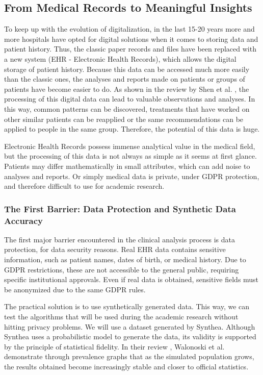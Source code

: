 \subsection{From Medical Records to Meaningful Insights}

To keep up with the evolution of digitalization, in the last 15-20 years more and more hospitals have opted for digital solutions when it comes to storing data and patient history. Thus, the classic paper records and files have been replaced with a new system (EHR - Electronic Health Records), which allows the digital storage of patient history. Because this data can be accessed much more easily than the classic ones, the analyses and reports made on patients or groups of patients have become easier to do. As shown in the review by Shen et al. \cite{shen2025}, the processing of this digital data can lead to valuable observations and analyses. In this way, common patterns can be discovered, treatments that have worked on other similar patients can be reapplied or the same recommendations can be applied to people in the same group. Therefore, the potential of this data is huge.

Electronic Health Records possess immense analytical value in the medical field, but the processing of this data is not always as simple as it seems at first glance. Patients may differ mathematically in small attributes, which can add noise to analyses and reports. Or simply medical data is private, under GDPR protection, and therefore difficult to use for academic research.

\subsubsection*{The First Barrier: Data Protection and Synthetic Data Accuracy}

The first major barrier encountered in the clinical analysis process is data protection, for data security reasons. Real EHR data contains sensitive information, such as patient names, dates of birth, or medical history. Due to GDPR restrictions, these are not accessible to the general public, requiring specific institutional approvals. Even if real data is obtained, sensitive fields must be anonymized due to the same GDPR rules.

The practical solution is to use synthetically generated data. This way, we can test the algorithms that will be used during the academic research without hitting privacy problems. We will use a dataset generated by Synthea. Although Synthea uses a probabilistic model to generate the data, its validity is supported by the principle of statistical fidelity. In their review \cite{walonoski2017}, Walonoski et al. demonstrate through prevalence graphs that as the simulated population grows, the results obtained become increasingly stable and closer to official statistics.

